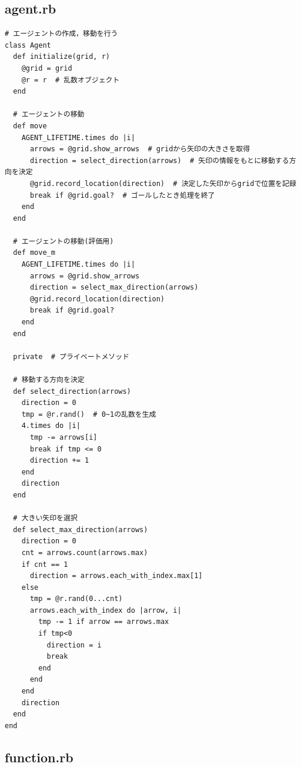 \documentclass[a4j,11pt]{jarticle}
\begin{document}
\newpage

\subsection{agent.rb}

\begin{verbatim}
# エージェントの作成，移動を行う
class Agent
  def initialize(grid, r)
    @grid = grid
    @r = r  # 乱数オブジェクト
  end

  # エージェントの移動
  def move
    AGENT_LIFETIME.times do |i|
      arrows = @grid.show_arrows  # gridから矢印の大きさを取得
      direction = select_direction(arrows)  # 矢印の情報をもとに移動する方向を決定
      @grid.record_location(direction)  # 決定した矢印からgridで位置を記録
      break if @grid.goal?  # ゴールしたとき処理を終了
    end
  end

  # エージェントの移動(評価用)
  def move_m
    AGENT_LIFETIME.times do |i|
      arrows = @grid.show_arrows
      direction = select_max_direction(arrows)
      @grid.record_location(direction)
      break if @grid.goal?
    end
  end

  private  # プライベートメソッド

  # 移動する方向を決定
  def select_direction(arrows)
    direction = 0
    tmp = @r.rand()  # 0~1の乱数を生成
    4.times do |i|
      tmp -= arrows[i]
      break if tmp <= 0
      direction += 1
    end
    direction
  end

  # 大きい矢印を選択
  def select_max_direction(arrows)
    direction = 0
    cnt = arrows.count(arrows.max)
    if cnt == 1
      direction = arrows.each_with_index.max[1]
    else
      tmp = @r.rand(0...cnt)
      arrows.each_with_index do |arrow, i|
        tmp -= 1 if arrow == arrows.max
        if tmp<0
          direction = i
          break
        end
      end
    end
    direction
  end
end
\end{verbatim}

\newpage

\subsection{function.rb}
\end{document}
